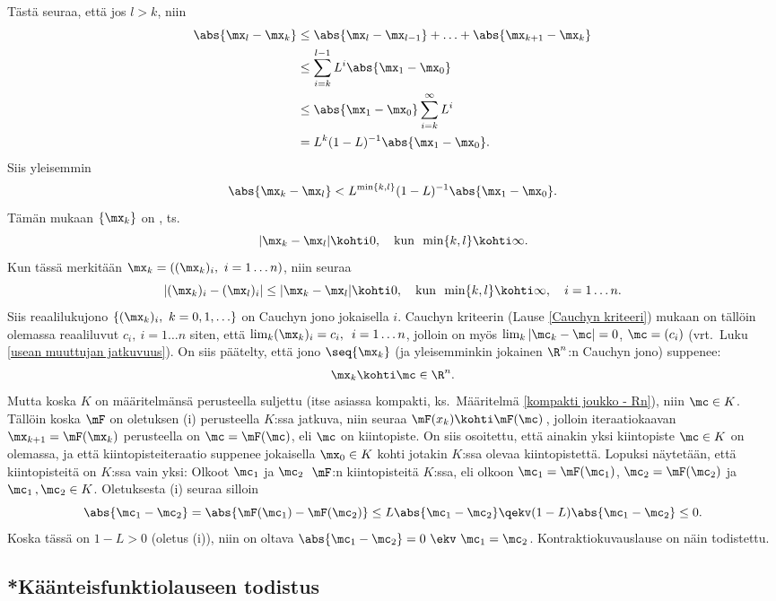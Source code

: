 Tästä seuraa, että jos $l>k$, niin
\begin{align*}
\abs{\mx_l-\mx_k} &\le \abs{\mx_l-\mx_{l-1}}+\ldots + \abs{\mx_{k+1}-\mx_k} \\
&\le \sum_{i=k}^{l-1} L^i\abs{\mx_1-\mx_0} \\
&\le \abs{\mx_1-\mx_0}\sum_{i=k}^{\infty} L^i \\
&=L^k(1-L)^{-1}\abs{\mx_1-\mx_0}.
\end{align*}
Siis yleisemmin
\[
\abs{\mx_k-\mx_l}<L^{\min \{k,l\}} (1-L)^{-1}\abs{\mx_1-\mx_0}.
\]
%
Tämän mukaan $\{\mx_k\}$ on , ts.\
\[
|\mx_k-\mx_l| \kohti 0, \quad \text{kun}\,\ \min\{k,l\} \kohti \infty.
\]
Kun tässä merkitään $\mx_k = ((\mx_k)_i,\ i=1 \ldots n)$, niin seuraa
\[
|(\mx_k)_i-(\mx_l)_i| \le |\mx_k-\mx_l| \kohti 0, \quad 
               \text{kun}\,\ \min\{k,l\} \kohti \infty, \quad i=1 \ldots n.
\]
Siis reaalilukujono $\{(\mx_k)_i,\ k=0,1,\ldots\}$ on Cauchyn jono jokaisella $i$. Cauchyn
kriteerin (Lause \ref{Cauchyn kriteeri}) mukaan on tällöin olemassa reaaliluvut
$c_i,\ i=1 \ldots n$ siten, että $\lim_k (\mx_k)_i = c_i,\,\ i=1 \ldots n$, jolloin on myös
$\lim_k|\mc_k-\mc|=0$, $\mc=(c_i)$ (vrt.\ Luku \ref{usean muuttujan jatkuvuus}). On siis
päätelty, että jono $\seq{\mx_k}$ (ja yleisemminkin jokainen $\R^n$:n Cauchyn jono) suppenee:  
\[
\mx_k\kohti \mc\in \R^n.
\]
Mutta koska $K$ on määritelmänsä perusteella suljettu (itse asiassa kompakti, ks.\
Määritelmä \ref{kompakti joukko - Rn}), niin $\mc\in K$. Tällöin koska $\mF$ on oletuksen (i)
perusteella $K$:ssa jatkuva, niin seuraa $\mF(x_k)\kohti\mF(\mc)\,$, jolloin iteraatiokaavan 
$\mx_{k+1}=\mF(\mx_k)$ perusteella on $\mc=\mF(\mc)$, eli $\mc$ on kiintopiste. On siis 
osoitettu, että ainakin yksi kiintopiste $\mc\in K$ on olemassa, ja että kiintopisteiteraatio
suppenee jokaisella $\mx_0\in K$ kohti jotakin $K$:ssa olevaa kiintopistettä. Lopuksi
näytetään, että kiintopisteitä on $K$:ssa vain yksi: Olkoot $\mc_1$ ja $\mc_2\,$ $\mF$:n
kiintopisteitä $K$:ssa, eli olkoon $\mc_1=\mF(\mc_1)$, $\mc_2=\mF(\mc_2)$ ja
$\mc_1\,,\mc_2\in K$. Oletuksesta (i) seuraa silloin
\[
\abs{\mc_1-\mc_2} =   \abs{\mF(\mc_1)-\mF(\mc_2)} 
                  \le L\abs{\mc_1-\mc_2} \qekv (1-L)\abs{\mc_1-\mc_2} \le 0.
\]
Koska tässä on $1-L>0$ (oletus (i)), niin on oltava $\abs{\mc_1-\mc_2}=0\ \ekv\ \mc_1=\mc_2$. 
Kontraktiokuvauslause on näin todistettu. \loppu
\index{kiintopisteiteraatio|)}

\subsection{*Käänteisfunktiolauseen todistus}

